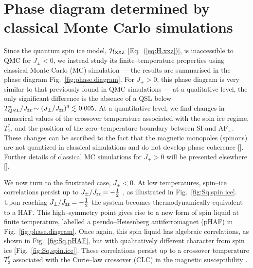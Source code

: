 \documentclass[apsrev4-1,prx,superscriptaddress,floatfix,twocolumn,longbibliography]{revtex4-1}
\begin{document}
\section{Phase diagram determined by classical Monte Carlo simulations}
\label{sec:phasediagram}


Since the quantum spin ice model, $\mathcal{H}_{\sf XXZ}$ [Eq.~(\ref{eq:H.xxz})], 
is inaccessible to QMC for \mbox{$J_{\pm} < 0$}, we instead study its finite--temperature 
properties using classical Monte Carlo (MC) simulation --- the results are summarised 
in the phase diagram Fig.~\ref{fig:phase.diagram}.   
%
For $J_{\pm} > 0$, this phase diagram is very similar to that previously 
found in QMC simulations \cite{banerjee08,kato15,shannon-book-chapter}
--- at a qualitative level, the only significant difference is the absence 
of a QSL below \mbox{$T_{QSL}^*/J_{\sf zz} \sim (J_{\pm}/J_{\sf zz})^3 \lesssim 0.005$}.
%
At a quantitative level, we find changes in numerical values of the 
crossover temperature associated with the spin ice regime, $T^*_1$, 
and the
position of the
zero--temperature boundary between 
SI and $\text{AF}_\perp$.
%
These changes can be ascribed to the fact that
the magnetic monopoles (spinons) are not quantized in
classical simulations and do not develop phase coherence 
[].   
%
Further details of classical MC simulations for \mbox{$J_\pm > 0$} 
will be presented  elsewhere [].


We now turn to the frustrated case, \mbox{$J_{\pm} < 0$}.
%
At low temperatures, spin--ice correlations persist up to 
\mbox{$J_{\pm}/J_{\sf zz} = -\frac{1}{2}$} \cite{Onoda2011a,petit16-PRB94}, 
as illustrated in Fig.~\ref{fig:Sq.spin.ice}.
%
Upon reaching \mbox{$J_{\pm}/J_{\sf zz} = -\frac{1}{2}$} 
 the system  becomes thermodynamically equivalent to 
a HAF.
%
This high--symmetry point gives rise to a new form of spin liquid at finite 
temperature, 
labelled a pseudo--Heisenberg antiferromagnet (pHAF) 
in Fig.~\ref{fig:phase.diagram}.  
%
Once again, this spin liquid has algebraic correlations, as shown in 
Fig.~\ref{fig:Sq.pHAF}, but with qualitatively different character  
from spin ice [Fig.~\ref{fig:Sq.spin.ice}].
%
These correlations persist up to a crossover temperature $T^*_3$ 
associated with the Curie--law crossover (CLC) in the magnetic 
susceptibility \cite{jaubert13}.
\end{document}
